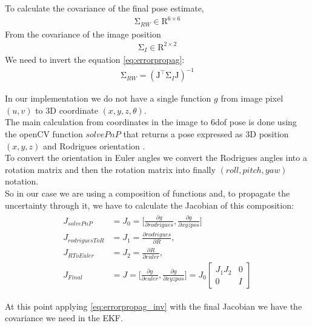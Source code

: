 To calculate the covariance of the final pose estimate, 
\begin{align}
\mathrm {\Sigma }_{RW} \in \mathrm{R}^{6 \times 6} 
\end{align}
From the covariance of the image position  
 \begin{align}
 \mathrm {\Sigma }_{I} \in \mathrm{R}^{2 \times 2} 
 \end{align}
We need to invert the equation \ref{eq:errorpropag}:
\begin{align}
 \mathrm{\Sigma}_{RW} = ( \mathrm{J}^{\top} \mathrm{\Sigma }_{I} \mathrm{J})^{-1} 
\label{eq:errorpropag_inv}
\end{align}

In our implementation we do not have a single function $g$ from image pixel $(u,v)$ to 3D coordinate $(x,y,z,\theta)$.\\
The main calculation from coordinates in the image to 6dof pose is done using the openCV function $solvePnP$ \cite{opencv_library} that returns a pose expressed as 3D position $(x,y,z)$ and Rodrigues orientation  \cite{belongie1999rodrigues}.\\
To convert the orientation in Euler angles we convert the Rodrigues angles into a rotation matrix and then the rotation matrix into finally $(roll,pitch,yaw)$ notation.\\
So in our case we are using a composition of functions and, to propagate the uncertainty through it, we have to calculate the Jacobian of this composition:
\begin{align}
\begin{split}
J_{solvePnP} &= J_0 = \Big[ \frac  {\partial g}{\partial rodrigues},  \frac {\partial g}{\partial xyzpos} \Big] \\[10pt]
J_{rodriguesToR} &= J_1 =  \frac  {\partial rodrigues}{\partial R}, \\[10pt]
J_{RToEuler} &= J_2 =  \frac  {\partial R}{\partial euler}, \\[10pt]
J_{Final} &= J = \Big[ \frac  {\partial g}{\partial euler},  \frac {\partial g}{\partial xyzpos} \Big]  = J_{0}{\begin{bmatrix}
J_{1}J_{2} & 0 \\[10pt]
0 & I 
\end{bmatrix}}
\end{split}
\end{align}

At this point applying \ref{eq:errorpropag_inv} with the final Jacobian we have the covariance we need in the EKF.



